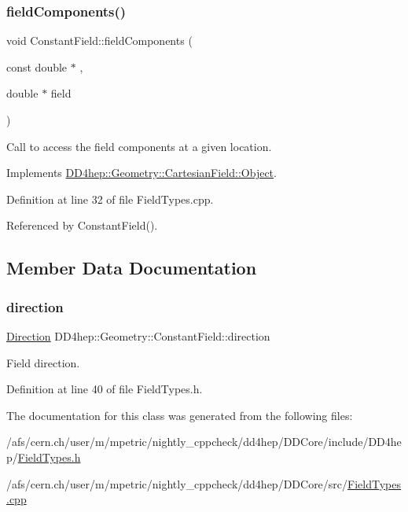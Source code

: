 \subsubsection{\texorpdfstring{field\+Components()}{fieldComponents()}}
{\footnotesize\ttfamily void Constant\+Field\+::field\+Components (\begin{DoxyParamCaption}\item[{const double $\ast$}]{,  }\item[{double $\ast$}]{field }\end{DoxyParamCaption})\hspace{0.3cm}{\ttfamily [virtual]}}



Call to access the field components at a given location. 



Implements \hyperlink{class_d_d4hep_1_1_geometry_1_1_cartesian_field_1_1_object_ab3fa7f39545c8b0f769ee1ddfd03ed90}{D\+D4hep\+::\+Geometry\+::\+Cartesian\+Field\+::\+Object}.



Definition at line 32 of file Field\+Types.\+cpp.



Referenced by Constant\+Field().



\subsection{Member Data Documentation}
\hypertarget{class_d_d4hep_1_1_geometry_1_1_constant_field_a986d167280511c4650ffa950188cdef7}{}\label{class_d_d4hep_1_1_geometry_1_1_constant_field_a986d167280511c4650ffa950188cdef7} 
\subsubsection{\texorpdfstring{direction}{direction}}
{\footnotesize\ttfamily \hyperlink{namespace_d_d4hep_1_1_geometry_a56730a0ddb9f3f089c415cd693bd7c19}{Direction} D\+D4hep\+::\+Geometry\+::\+Constant\+Field\+::direction}



Field direction. 



Definition at line 40 of file Field\+Types.\+h.



The documentation for this class was generated from the following files\+:\begin{DoxyCompactItemize}
\item 
/afs/cern.\+ch/user/m/mpetric/nightly\+\_\+cppcheck/dd4hep/\+D\+D\+Core/include/\+D\+D4hep/\hyperlink{_field_types_8h}{Field\+Types.\+h}\item 
/afs/cern.\+ch/user/m/mpetric/nightly\+\_\+cppcheck/dd4hep/\+D\+D\+Core/src/\hyperlink{_field_types_8cpp}{Field\+Types.\+cpp}\end{DoxyCompactItemize}

